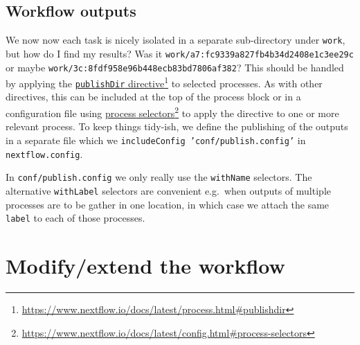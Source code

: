 \subsection{Workflow outputs}

We now now each task is nicely isolated in a separate sub-directory under \texttt{work}, but how do I find my results? Was it \texttt{work/a7:fc9339a827fb4b34d2408e1c3ee29c} or maybe \texttt{work/3c:8fdf958e96b448ecb83bd7806af382}? This should be handled by applying the \href{https://www.nextflow.io/docs/latest/process.html#publishdir}{\texttt{publishDir} directive}\footnote{\url{https://www.nextflow.io/docs/latest/process.html\#publishdir}} to selected processes. As with other directives, this can be included at the top of the process block or in a configuration file using \href{https://www.nextflow.io/docs/latest/config.html#process-selectors}{process selectors}\footnote{\url{https://www.nextflow.io/docs/latest/config.html\#process-selectors}} to apply the directive to one or more relevant process. To keep things tidy-ish, we define the publishing of the outputs in a separate file 
which we \texttt{includeConfig 'conf/publish.config'} in \texttt{nextflow.config}. 

In \texttt{conf/publish.config} we only really use the \texttt{withName} selectors.
The alternative \texttt{withLabel} selectors are convenient e.g.\ when outputs of multiple 
processes are to be gather in one location, in which case we attach the same \texttt{label} to each of those processes.

%

\section{Modify/extend the workflow}

